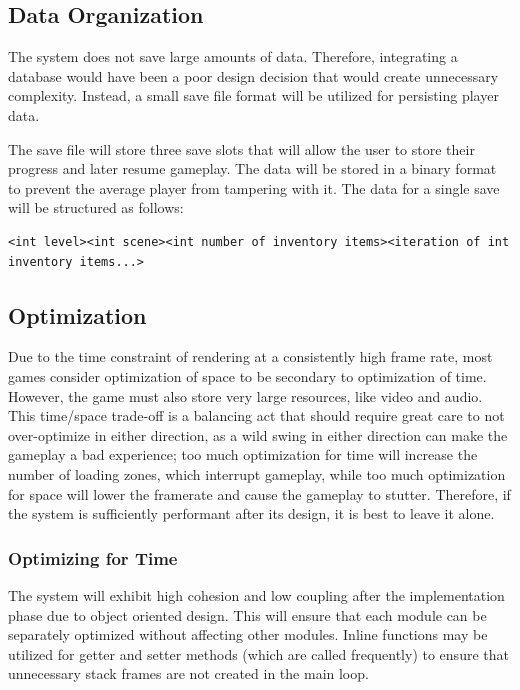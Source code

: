 \documentclass{article}
\begin{document}
  \subsection{Data Organization}
      The system does not save large amounts of data. Therefore, integrating a database would have been a poor design decision that would create unnecessary complexity. Instead, a small save file format will be utilized for persisting player data.

      The save file will store three save slots that will allow the user to store their progress and later resume gameplay. The data will be stored in a binary format to prevent the average player from tampering with it. The data for a single save will be structured as follows:

      \begin{verbatim}
<int level><int scene><int number of inventory items><iteration of int inventory items...>
      \end{verbatim}

	\subsection{Optimization}
      Due to the time constraint of rendering at a consistently high frame rate, most games consider optimization of space to be secondary to optimization of time. However, the game must also store very large resources, like video and audio. This time/space trade-off is a balancing act that should require great care to not over-optimize in either direction, as a wild swing in either direction can make the gameplay a bad experience; too much optimization for time will increase the number of loading zones, which interrupt gameplay, while too much optimization for space will lower the framerate and cause the gameplay to stutter. Therefore, if the system is sufficiently performant after its design, it is best to leave it alone.

		\subsubsection{Optimizing for Time}
      The system will exhibit high cohesion and low coupling after the implementation phase due to object oriented design. This will ensure that each module can be separately optimized without affecting other modules. Inline functions may be utilized for getter and setter methods (which are called frequently) to ensure that unnecessary stack frames are not created in the main loop.
\end{document}
